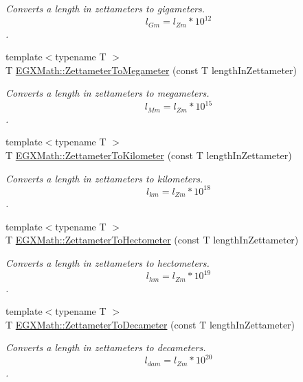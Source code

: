 \begin{DoxyCompactItemize}
\begin{DoxyCompactList}\small\item\em Converts a length in zettameters to gigameters. \[ l_{Gm}=l_{Zm} * 10^{12} \]. \end{DoxyCompactList}\item 
{\footnotesize template$<$typename T $>$ }\\T \mbox{\hyperlink{group___e_g_x_math-_conversions-_length_conversions-_s_i-_zettameter-_s_i_gaf29478b073f568afbf9c70b3c2eb94e4}{E\+G\+X\+Math\+::\+Zettameter\+To\+Megameter}} (const T length\+In\+Zettameter)
\begin{DoxyCompactList}\small\item\em Converts a length in zettameters to megameters. \[ l_{Mm}=l_{Zm} * 10^{15} \]. \end{DoxyCompactList}\item 
{\footnotesize template$<$typename T $>$ }\\T \mbox{\hyperlink{group___e_g_x_math-_conversions-_length_conversions-_s_i-_zettameter-_s_i_ga99d03473393cdeeeca462cdd0928c9d9}{E\+G\+X\+Math\+::\+Zettameter\+To\+Kilometer}} (const T length\+In\+Zettameter)
\begin{DoxyCompactList}\small\item\em Converts a length in zettameters to kilometers. \[ l_{km}=l_{Zm} * 10^{18} \]. \end{DoxyCompactList}\item 
{\footnotesize template$<$typename T $>$ }\\T \mbox{\hyperlink{group___e_g_x_math-_conversions-_length_conversions-_s_i-_zettameter-_s_i_gada762e454268ba506fcbf3caae74f14e}{E\+G\+X\+Math\+::\+Zettameter\+To\+Hectometer}} (const T length\+In\+Zettameter)
\begin{DoxyCompactList}\small\item\em Converts a length in zettameters to hectometers. \[ l_{hm}=l_{Zm} * 10^{19} \]. \end{DoxyCompactList}\item 
{\footnotesize template$<$typename T $>$ }\\T \mbox{\hyperlink{group___e_g_x_math-_conversions-_length_conversions-_s_i-_zettameter-_s_i_ga3346f705d6a1e23f103456886cfca420}{E\+G\+X\+Math\+::\+Zettameter\+To\+Decameter}} (const T length\+In\+Zettameter)
\begin{DoxyCompactList}\small\item\em Converts a length in zettameters to decameters. \[ l_{dam}=l_{Zm} * 10^{20} \]. \end{DoxyCompactList}\item 

\end{DoxyCompactItemize}
